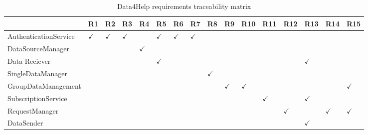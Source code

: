 \begin{table}
\begin{adjustwidth}{-4cm}{}
\captionsetup{justification=centering}
\caption{Data4Help requirements traceability matrix}
  \label{tab:table1}
\begin{tabular}{|l||l|l|l|l|l|l|l|l|l|l|l|l|l|l|l|}
\hline
\cellcolor[HTML]{EFEFEF}                      & \cellcolor[HTML]{EFEFEF} R1 & \cellcolor[HTML]{EFEFEF} R2 & \cellcolor[HTML]{EFEFEF} R3 & \cellcolor[HTML]{EFEFEF} R4 & \cellcolor[HTML]{EFEFEF} R5 & \cellcolor[HTML]{EFEFEF} R6 & \cellcolor[HTML]{EFEFEF} R7 & \cellcolor[HTML]{EFEFEF} R8 & \cellcolor[HTML]{EFEFEF} R9 &\cellcolor[HTML]{EFEFEF}  R10 & \cellcolor[HTML]{EFEFEF} R11 & \cellcolor[HTML]{EFEFEF} R12 & \cellcolor[HTML]{EFEFEF} R13 & \cellcolor[HTML]{EFEFEF} R14 & \cellcolor[HTML]{EFEFEF} R15\\ \hline \hline
\cellcolor[HTML]{EFEFEF}AuthenticationService & $\checkmark$  & $\checkmark$  & $\checkmark$  &    & $\checkmark$  & $\checkmark$  & $\checkmark$  &    &    &     &     &     &     &     & \\ \hline
\cellcolor[HTML]{EFEFEF}DataSourceManager     &    &    &    & $\checkmark$  &    &    &    &    &    &     &     &     &     &     & \\ \hline
\cellcolor[HTML]{EFEFEF}Data Reciever         &    &    &    &    & $\checkmark$  &    &    &    &    &     &     &     & $\checkmark$   &     & \\ \hline
\cellcolor[HTML]{EFEFEF} SingleDataManager    &    &    &    &    &    &    &    & $\checkmark$  &    &     &     &     &     &     & \\ \hline
\cellcolor[HTML]{EFEFEF} GroupDataManagement  &    &    &    &    &    &    &    &    & $\checkmark$  & $\checkmark$   &     &     &     &     & $\checkmark$ \\ \hline
\cellcolor[HTML]{EFEFEF} SubscriptionService  &    &    &    &    &    &    &    &    &    &     & $\checkmark$   &     & $\checkmark$   &     & \\ \hline
\cellcolor[HTML]{EFEFEF} RequestManager       &    &    &    &    &    &    &    &    &    &     &     & $\checkmark$   &     & $\checkmark$   & $\checkmark$ \\ \hline
\cellcolor[HTML]{EFEFEF} DataSender           &    &    &    &    &    &    &    &    &    &     &     &     & $\checkmark$   &     & \\ \hline
\end{tabular}
\end{adjustwidth}
\end{table}


